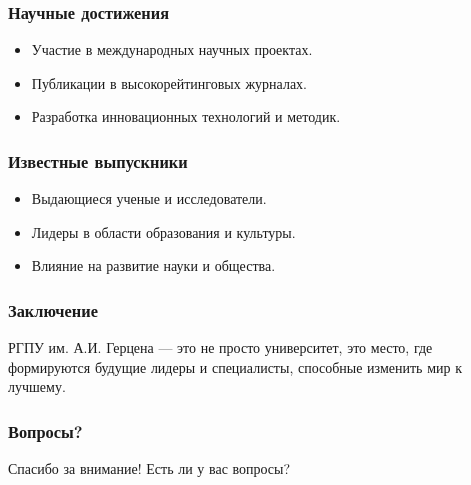 \documentclass{beamer}
\begin{document}
\begin{frame}
\frametitle{Научные достижения}
\begin{itemize}
    \item Участие в международных научных проектах.
    \item Публикации в высокорейтинговых журналах.
    \item Разработка инновационных технологий и методик.
\end{itemize}
\end{frame}

\begin{frame}
\frametitle{Известные выпускники}
\begin{itemize}
    \item Выдающиеся ученые и исследователи.
    \item Лидеры в области образования и культуры.
    \item Влияние на развитие науки и общества.
\end{itemize}
\end{frame}

\begin{frame}
\frametitle{Заключение}
РГПУ им. А.И. Герцена — это не просто университет, это место, где формируются будущие лидеры и специалисты, способные изменить мир к лучшему.
\end{frame}

\begin{frame}
\frametitle{Вопросы?}
Спасибо за внимание! Есть ли у вас вопросы?
\end{frame}
\end{document}
